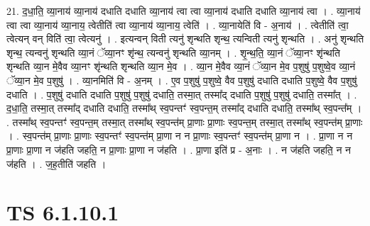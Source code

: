 \documentclass[17pt]{extarticle}
\begin{document}
21. द॒धा॒ति॒ व्या॒नाय॑ व्या॒नाय॑ दधाति दधाति व्या॒नाय॑ त्वा त्वा व्या॒नाय॑ दधाति दधाति व्या॒नाय॑ त्वा । . व्या॒नाय॑ त्वा त्वा व्या॒नाय॑ व्या॒नाय॒ त्वेतीति॑ त्वा व्या॒नाय॑ व्या॒नाय॒ त्वेति॑ । . व्या॒नायेति॑ वि - अ॒नाय॑ । . त्वेतीति॑ त्वा॒ त्वेत्यन् वन् विति॑ त्वा॒ त्वेत्यनु॑ । . इत्यन्वन् विती त्यनु॑ शृन्थति शृन्थ॒ त्यन्विती त्यनु॑ शृन्थति । . अनु॑ शृन्थति शृन्थ॒ त्यन्वनु॑ शृन्थति व्या॒नं ॅव्या॒नꣳ शृ॑न्थ॒ त्यन्वनु॑ शृन्थति व्या॒नम् । . शृ॒न्थ॒ति॒ व्या॒नं ॅव्या॒नꣳ शृ॑न्थति शृन्थति व्या॒न मे॒वैव व्या॒नꣳ शृ॑न्थति शृन्थति व्या॒न मे॒व । . व्या॒न मे॒वैव व्या॒नं ॅव्या॒न मे॒व प॒शुषु॑ प॒शुष्वे॒व व्या॒नं ॅव्या॒न मे॒व प॒शुषु॑ । . व्या॒नमिति॑ वि - अ॒नम् । . ए॒व प॒शुषु॑ प॒शुष्वे॒ वैव प॒शुषु॑ दधाति दधाति प॒शुष्वे॒ वैव प॒शुषु॑ दधाति । . प॒शुषु॑ दधाति दधाति प॒शुषु॑ प॒शुषु॑ दधाति॒ तस्मा॒त् तस्मा᳚द् दधाति प॒शुषु॑ प॒शुषु॑ दधाति॒ तस्मा᳚त् । . द॒धा॒ति॒ तस्मा॒त् तस्मा᳚द् दधाति दधाति॒ तस्मा᳚थ् स्व॒पन्तꣳ॑ स्व॒पन्त॒म् तस्मा᳚द् दधाति दधाति॒ तस्मा᳚थ् स्व॒पन्त᳚म् । . तस्मा᳚थ् स्व॒पन्तꣳ॑ स्व॒पन्त॒म् तस्मा॒त् तस्मा᳚थ् स्व॒पन्त॑म् प्रा॒णाः प्रा॒णाः स्व॒पन्त॒म् तस्मा॒त् तस्मा᳚थ् स्व॒पन्त॑म् प्रा॒णाः । . स्व॒पन्त॑म् प्रा॒णाः प्रा॒णाः स्व॒पन्तꣳ॑ स्व॒पन्त॑म् प्रा॒णा न न प्रा॒णाः स्व॒पन्तꣳ॑ स्व॒पन्त॑म् प्रा॒णा न । . प्रा॒णा न न प्रा॒णाः प्रा॒णा न ज॑हति जहति॒ न प्रा॒णाः प्रा॒णा न ज॑हति । . प्रा॒णा इति॑ प्र - अ॒नाः । . न ज॑हति जहति॒ न न ज॑हति । . ज॒ह॒तीति॑ जहति । \newline
\pagebreak
{}

\section{ TS 6.1.10.1 }
\end{document}
